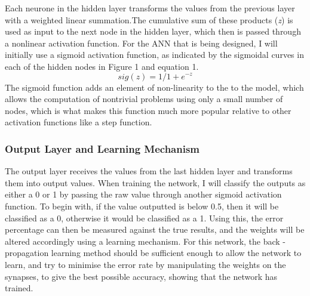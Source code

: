 \documentclass[11pt]{article}
\begin{document}
Each neurone in the hidden layer transforms the values from the previous layer with a weighted linear summation.The cumulative sum of these products (\textit{z}) is used as input to the next node in the hidden layer, which then is passed through a nonlinear activation function. For the ANN that is being designed, I will initially use a sigmoid activation function, as indicated by the sigmoidal curves in each of the hidden nodes in Figure 1 and equation 1. \begin{equation} sig(z) = 1/1+e^{-z} \end{equation}
The sigmoid function adds an element of non-linearity to the to the model, which allows the computation of nontrivial problems using only a small number of nodes, which is what makes this function much more popular relative to other activation functions like a step function.
\subsubsection{Output Layer and Learning Mechanism}
The output layer receives the values from the last hidden layer and transforms them into output values. When training the network, I will classify the outputs as either a 0 or 1 by passing the raw value through another sigmoid activation function. To begin with, if the value outputted is below 0.5, then it will be classified as a 0, otherwise it would be classified as a 1. Using this, the error percentage can then be measured against the true results, and the weights will be altered accordingly using a learning mechanism. For this network, the back - propagation learning method should be sufficient enough to allow the network to learn, and try to minimise the error rate by manipulating the weights on the synapses, to give the best possible accuracy, showing that the network has trained.\\
\end{document}
